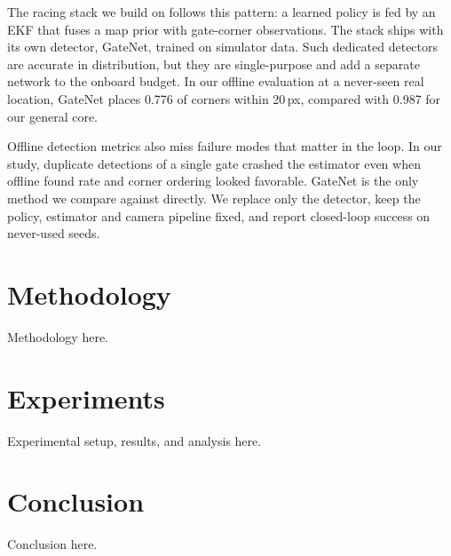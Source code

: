 \documentclass[10pt,twocolumn,letterpaper]{article}
\begin{document}
The racing stack we build on follows this pattern: a learned policy is fed by an EKF that fuses a map prior with gate-corner observations. The stack ships with its own detector, GateNet, trained on simulator data. Such dedicated detectors are accurate in distribution, but they are single-purpose and add a separate network to the onboard budget. In our offline evaluation at a never-seen real location, GateNet places 0.776 of corners within 20\,px, compared with 0.987 for our general core.

Offline detection metrics also miss failure modes that matter in the loop. In our study, duplicate detections of a single gate crashed the estimator even when offline found rate and corner ordering looked favorable. GateNet is the only method we compare against directly. We replace only the detector, keep the policy, estimator and camera pipeline fixed, and report closed-loop success on never-used seeds.

\section{Methodology}
\label{sec:method}
Methodology here.

\section{Experiments}
\label{sec:experiments}
Experimental setup, results, and analysis here.

\section{Conclusion}
\label{sec:conclusion}
Conclusion here.

{
    \small
    
    
}

\end{document}
